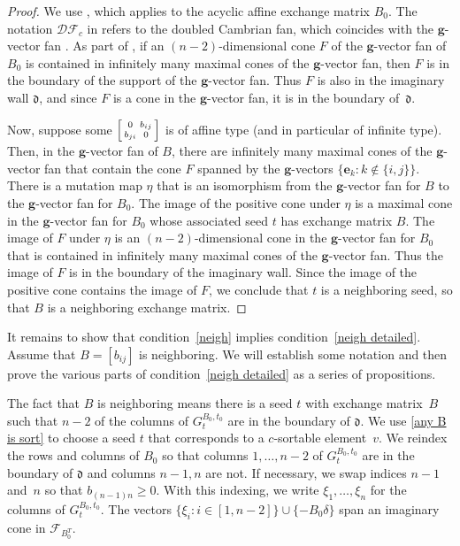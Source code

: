 \documentclass{amsart}
\theoremstyle{definition}
\theoremstyle{remark}
\numberwithin{equation}{section}
\newcommand{\set}[1]{{\lbrace #1 \rbrace}}
\newcommand{\F}{{\mathcal F}}
\newcommand{\0}{{\mathbf{0}}}
\newcommand{\g}{\mathbf{g}}
\renewcommand{\b}{\mathbf{b}}
\newcommand{\e}{\mathbf{e}}
\renewcommand{\d}{{\mathfrak d}}
\newcommand{\DF}{{\mathcal {DF}}}
\begin{document}
\begin{proof}
We use \cite[Corollary~4.18]{afframe}, which applies to the acyclic affine exchange matrix $B_0$.
The notation $\DF_c$ in \cite{afframe} refers to the doubled Cambrian fan, which coincides with the $\g$-vector fan \cite[Corollary~1.3]{afframe}.
As part of \cite[Corollary~4.18]{afframe}, if an $(n-2)$-dimensional cone $F$ of the $\g$-vector fan of $B_0$ is contained in infinitely many maximal cones of the $\g$-vector fan, then $F$ is in the boundary of the support of the $\g$-vector fan.
Thus $F$ is also in the imaginary wall $\d$, and since $F$ is a cone in the $\g$-vector fan, it is in the boundary of~$\d$.

Now, suppose some $\begin{bsmallmatrix}0&b_{ij}\\b_{ji}&0\end{bsmallmatrix}$ is of affine type (and in particular of infinite type).
Then, in the $\g$-vector fan of $B$, there are infinitely many maximal cones of the $\g$-vector fan that contain the cone $F$ spanned by the $\g$-vectors $\set{\e_k:k\not\in\set{i,j}}$.
There is a mutation map $\eta$ that is an isomorphism from the $\g$-vector fan for $B$ to the $\g$-vector fan for $B_0$.
The image of the positive cone under $\eta$ is a maximal cone in the $\g$-vector fan for $B_0$ whose associated seed $t$ has exchange matrix $B$.
The image of $F$ under $\eta$ is an $(n-2)$-dimensional cone in the $\g$-vector fan for $B_0$ that is contained in infinitely many maximal cones of the $\g$-vector fan.
Thus the image of $F$ is in the boundary of the imaginary wall.
Since the image of the positive cone contains the image of $F$, we conclude that $t$ is a neighboring seed, so that $B$ is a neighboring exchange matrix.
\end{proof}

It remains to show that condition~\eqref{neigh} implies condition~\eqref{neigh detailed}.
Assume that ${B=[b_{ij}]}$ is neighboring.
We will establish some notation and then prove the various parts of condition~\eqref{neigh detailed} as a series of propositions.

The fact that $B$ is neighboring means there is a seed $t$ with exchange matrix~$B$ such that $n-2$ of the columns of $G^{B_0,t_0}_t$ are in the boundary of $\d$.
We use \cref{any B is sort} to choose a seed $t$ that corresponds to a $c$-sortable element~$v$.
We reindex the rows and columns of $B_0$ so that columns $1,\ldots,n-2$ of $G^{B_0,t_0}_t$ are in the boundary of $\d$ and columns $n-1,n$ are not.
If necessary, we swap indices $n-1$ and~$n$ so that $b_{(n-1)n}\ge0$.
With this indexing, we write $\xi_1,\ldots,\xi_n$ for the columns of $G^{B_0,t_0}_t$.
The vectors $\set{\xi_i:i\in[1,n-2]}\cup\set{-B_0\delta}$ span an imaginary cone in $\F_{B_0^T}$.
\end{document}
